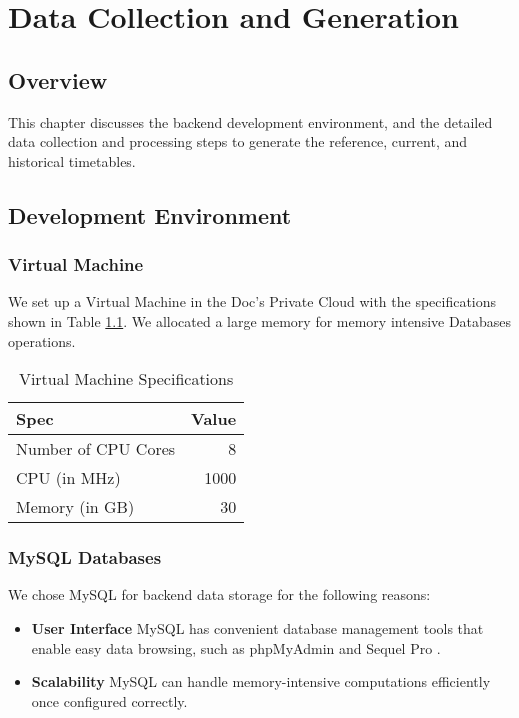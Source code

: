 \chapter{Data Collection and Generation}
\label{ch:data_generation}
\section{Overview}
\par This chapter discusses the backend development environment, and the detailed data collection and processing steps to generate the reference, current, and historical timetables.


\section{Development Environment}
\subsection{Virtual Machine}
\par We set up a Virtual Machine in the Doc's Private Cloud\cite{private_cloud} with the specifications shown in Table \ref{table:virtual_machine}. We allocated a large memory for memory intensive Databases operations.

\begin{table}
\centering
\begin{tabular}{@{}lr@{}} \toprule
Spec & Value \\ \midrule
Number of CPU Cores & 8 \\
CPU (in MHz) & 1000 \\
Memory (in GB) & 30 \\
 \bottomrule
\end{tabular}
\caption{Virtual Machine Specifications}
\label{table:virtual_machine}
\end{table}

\subsection{MySQL Databases}
\par We chose MySQL for backend data storage for the following reasons:

\begin{itemize}
  \item \textbf{User Interface} MySQL has convenient database management tools that enable easy data browsing, such as phpMyAdmin\cite{phpmyadmin} and Sequel Pro \cite{sequel_pro}.
  \item \textbf{Scalability} MySQL can handle memory-intensive computations efficiently once configured correctly.
\end{itemize}

